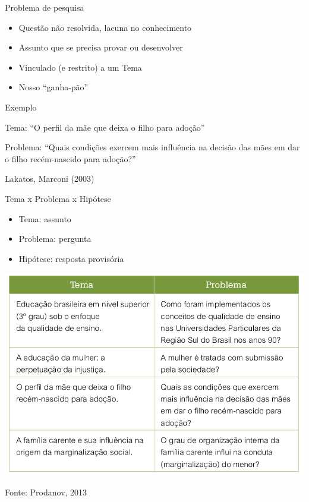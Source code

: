 \documentclass{beamer}
\begin{document}

\begin{frame}{Problema de pesquisa}
  \begin{itemize}
  \item Questão não resolvida, lacuna no conhecimento
  \item Assunto que se precisa provar ou desenvolver
  \item Vinculado (e restrito) a um Tema
  \item Nosso ``ganha-pão''
  \end{itemize}
\end{frame}

\begin{frame}{Exemplo}
  \begin{example}
    Tema: ``O perfil da mãe que deixa o filho para adoção''

    \bigskip

    Problema: ``Quais condições exercem mais influência na decisão das
    mães em dar o filho recém-nascido para adoção?''
  \end{example}
  Lakatos, Marconi (2003)
\end{frame}

\begin{frame}{Tema x Problema x Hipótese}
  \begin{itemize}
  \item Tema: assunto
  \item Problema: pergunta
  \item Hipótese: resposta provisória
  \end{itemize}
\end{frame}

\begin{frame}
  \includegraphics[height=0.8\textheight]{tema_problema}

  Fonte: Prodanov, 2013
\end{frame}
\end{document}
